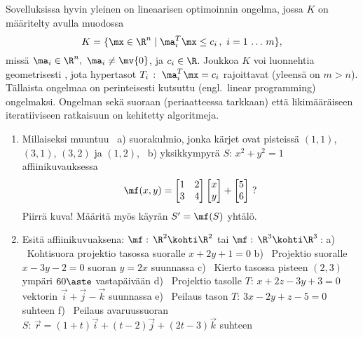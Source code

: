 Sovelluksissa hyvin yleinen on lineaarisen optimoinnin ongelma, jossa $K$ on määritelty 
%
 avulla muodossa
\[
K = \{\mx\in\R^n \mid \ma_i^T\mx \le c_i\,,\ i=1\,\ldots\,m\},
\]
missä $\ma_i\in\R^n,\ \ma_i\neq\mv{0}$, ja $c_i\in\R$. Joukkoa $K$ voi luonnehtia geometrisesti
%
, jota hypertasot $T_i\,:\ \ma_i^T\mx=c_i$ rajoittavat (yleensä on $m>n$).
Tällaista ongelmaa on perinteisesti kutsuttu
%
 (engl.\ linear programming) ongelmaksi. Ongelman sekä suoraan
(periaatteessa tarkkaan) että likimääräiseen iteratiiviseen ratkaisuun on kehitetty algoritmeja.

\Harj
\begin{enumerate}

\item
Millaiseksi muuntuu \, a) suorakulmio, jonka kärjet ovat pisteissä $(1,1)$, $(3,1)$, $(3,2)$ ja
$(1,2)$, \ b) yksikkympyrä $S:\,x^2+y^2=1$ affiinikuvauksessa
\[
\mf(x,y)=\begin{bmatrix} 1&2\\3&4 \end{bmatrix} \begin{bmatrix} x\\y \end{bmatrix} +
         \begin{bmatrix} 5\\6 \end{bmatrix} \ ?
\]
Piirrä kuva! Määritä myös käyrän $S'=\mf(S)$ yhtälö.

\item
Esitä affiinikuvuaksena: $\mf:\,\R^2\kohti\R^2$ tai $\mf:\,\R^3\kohti\R^3$\,: 
\vspace{1mm}\newline
a) \ Kohtisuora projektio tasossa suoralle $x+2y+1=0$ \newline
b) \ Projektio suoralle $x-3y-2=0$ suoran $y=2x$ suunnassa \newline
c) \ Kierto tasossa pisteen $(2,3)$ ympäri $60\aste$ vastapäivään \newline
d) \ Projektio tasolle $T:\,x+2z-3y+3=0$ vektorin $\vec i+\vec j-\vec k$ suunnassa \newline
e) \ Peilaus tason $T:\,3x-2y+z-5=0$ suhteen \newline
f) \ Peilaus avaruussuoran $S:\,\vec r=(1+t)\vec i+(t-2)\vec j+(2t-3)\vec k$ suhteen


\end{enumerate}
